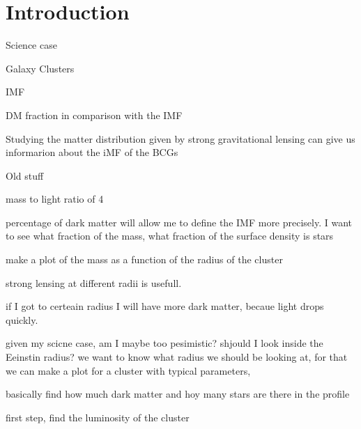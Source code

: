 \chapter{Introduction}

Science case

Galaxy Clusters

IMF

DM fraction in comparison with the IMF 

Studying the matter distribution given by strong gravitational lensing can give us informarion about the iMF of the BCGs

Old stuff

mass to light ratio of 4

percentage of dark matter will allow me to define the IMF more precisely. I want to see what fraction of the mass, what fraction of the surface density is stars

make a plot of the mass as a function of the radius of the cluster 

strong lensing at different radii is usefull.

if I got to certeain radius I will have more dark matter, becaue light drops quickly. 

given my scicne case, am I maybe too pesimistic? shjould I look inside the Eeinstin radius? we want to know what radius we should be looking at, for that we can make a plot for a cluster with typical parameters, 

basically find how much dark matter and hoy many stars are there in the profile

first step, find the luminosity of the cluster





\newpage
